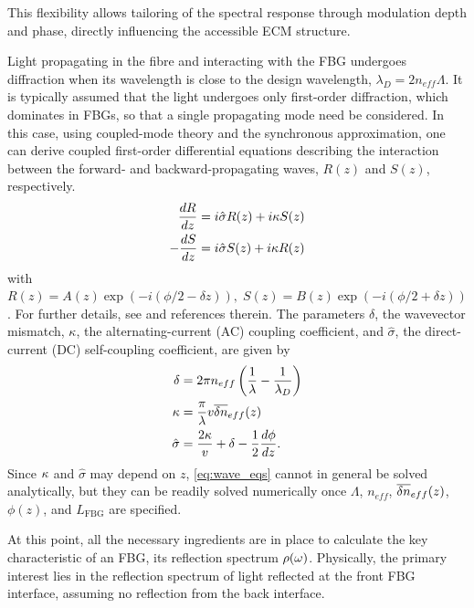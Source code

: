 This flexibility allows tailoring of the spectral response through modulation depth and phase, directly influencing the accessible ECM structure.
%
\par
%
Light propagating in the fibre and interacting with the FBG undergoes diffraction when its wavelength is close to the design wavelength, $\lambda_D = 2 n_{eff} \Lambda$.
It is typically assumed that the light undergoes only first-order diffraction, which dominates in FBGs, so that a single propagating mode need be considered.
In this case, using coupled-mode theory and the synchronous approximation, one can derive coupled first-order differential equations describing the interaction between the forward- and backward-propagating waves, $R(z)$ and $S(z)$, respectively.
%
\begin{equation}
\label{eq:wave_eqs}
    \begin{aligned}
        \frac{dR}{dz} &= i \hat{\sigma} R(z) + i \kappa S(z) \\
        -\frac{dS}{dz} &= i \hat{\sigma} S(z) + i \kappa R(z)
    \end{aligned}
\end{equation}
%
with $R(z) = A(z) \exp{ \left( -i \left( \phi/2 -\delta z \right) \right) }, \; S(z) = B(z) \exp{ \left( -i \left( \phi/2 + \delta z \right) \right) }$.
For further details, see \cite{erdogan1997fiber} and references therein.
The parameters $\delta$, the wavevector mismatch, $\kappa$, the alternating-current (AC) coupling coefficient, and $\hat{\sigma}$, the direct-current (DC) self-coupling coefficient, are given by
%
\begin{align}
    \label{eq:delta}
    \delta &= 2 \pi n_{eff} \left( \frac{1}{\lambda} - \frac{1}{\lambda_D} \right) \\
    \label{eq:kappa}
    \kappa &= \frac{\pi}{\lambda} v \overline{\delta n}_{eff}(z)\\
    \label{eq:sigma}
    \hat{\sigma} &= \frac{2\kappa}{v} + \delta -\frac{1}{2}\frac{d\phi}{dz}.
\end{align}
%
Since $\kappa$ and $\hat{\sigma}$ may depend on $z$, \eqref{eq:wave_eqs} cannot in general be solved analytically, but they can be readily solved numerically once $\Lambda$, $n_{eff}$, $\overline{\delta n}_{eff}(z)$, $\phi(z)$, and $L_\text{FBG}$ are specified.
%
\par
%
At this point, all the necessary ingredients are in place to calculate the key characteristic of an FBG, its reflection spectrum $\rho(\omega)$.
Physically, the primary interest lies in the reflection spectrum of light reflected at the front FBG interface, assuming no reflection from the back interface.
